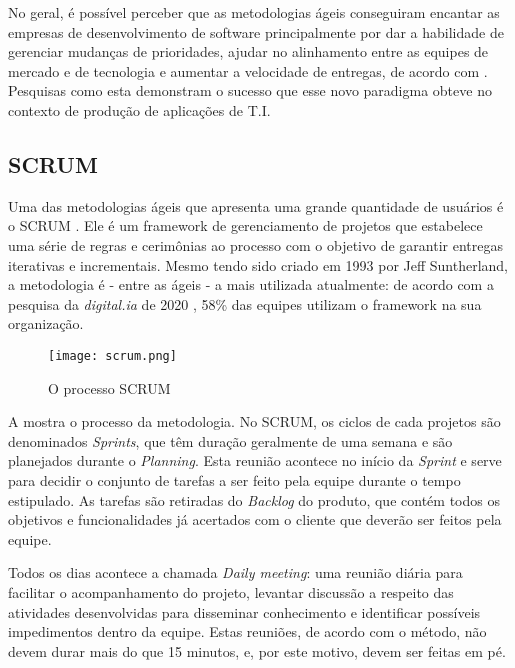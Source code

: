 No geral, é possível perceber que as metodologias ágeis conseguiram encantar as empresas de desenvolvimento de software principalmente por dar a habilidade de gerenciar mudanças de prioridades, ajudar no alinhamento entre as equipes de mercado e de tecnologia e aumentar a velocidade de entregas, de acordo com \cite{stateAgileReport2020}. Pesquisas como esta demonstram o sucesso que esse novo paradigma obteve no contexto de produção de aplicações de T.I. 

\vspace{3mm}
\subsection{SCRUM}
Uma das metodologias ágeis que apresenta uma grande quantidade de usuários é o SCRUM \cite{scrumBook}. Ele é um framework de gerenciamento de projetos que estabelece uma série de regras e cerimônias ao processo com o objetivo de garantir entregas iterativas e incrementais. Mesmo tendo sido criado em 1993 por Jeff Suntherland, a metodologia é - entre as ágeis - a mais utilizada atualmente: de acordo com a pesquisa da \emph{digital.ia} de 2020 \cite{stateAgileReport2020}, 58\% das equipes utilizam o framework na sua organização.

\begin{figure}[ht]
\begin{center}
\texttt{[image: scrum.png]}
\end{center}
\caption[O processo SCRUM]{
    O processo SCRUM
}\label{scrum}
\end{figure}

A  mostra o processo da metodologia. No SCRUM, os ciclos de cada projetos são denominados \emph{Sprints}, que têm duração geralmente de uma semana e são planejados durante o \emph{Planning}. Esta reunião acontece no início da \emph{Sprint} e serve para decidir o conjunto de tarefas a ser feito pela equipe durante o tempo estipulado. As tarefas são retiradas do \emph{Backlog} do produto, que contém todos os objetivos e funcionalidades já acertados com o cliente que deverão ser feitos pela equipe.

Todos os dias acontece a chamada \emph{Daily meeting}: uma reunião diária para facilitar o acompanhamento do projeto, levantar discussão a respeito das atividades desenvolvidas para disseminar conhecimento e identificar possíveis impedimentos dentro da equipe. Estas reuniões, de acordo com o método, não devem durar mais do que 15 minutos, e, por este motivo, devem ser feitas em pé.

